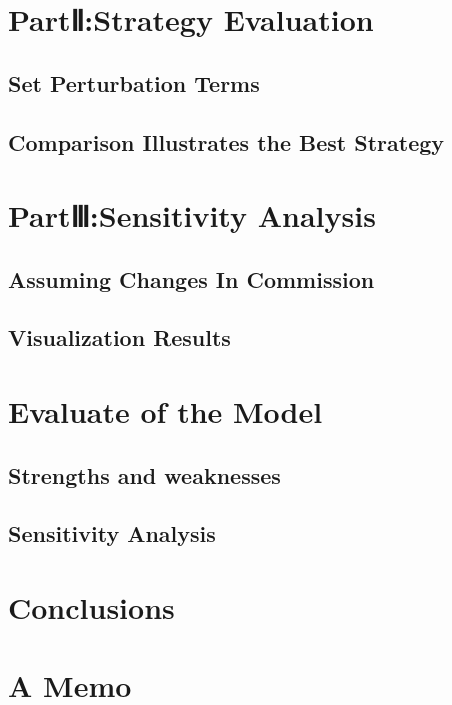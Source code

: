 \documentclass{mcmthesis}
\begin{document}
\section{PartⅡ:Strategy Evaluation}
\subsection{Set Perturbation Terms }%

\subsection{Comparison Illustrates the Best Strategy}




\section{PartⅢ:Sensitivity Analysis}
\subsection{Assuming Changes In Commission}

\subsection{Visualization Results}%





\section{Evaluate of the Model}
\subsection{Strengths and weaknesses}

\subsection{Sensitivity Analysis}




\section{Conclusions}


\section{A Memo}
\end{document}
